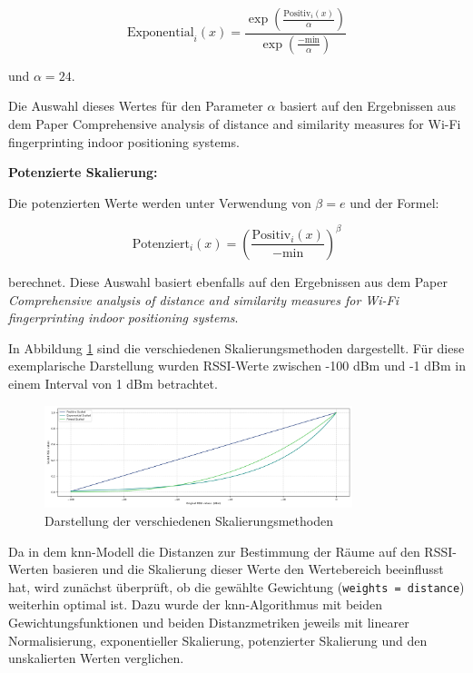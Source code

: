 \begin{equation}
    \text{Exponential}_i(x) = \frac{\exp\left(\frac{\text{Positiv}_i(x)}{\alpha}\right)}{\exp\left(\frac{-\text{min}}{\alpha}\right)}
    \label{eq:exponential_representation}
\end{equation}

und \(\alpha = 24\).

Die Auswahl dieses Wertes für den Parameter \(\alpha\) basiert auf den Ergebnissen aus dem Paper {Comprehensive analysis of distance and similarity measures for Wi-Fi fingerprinting indoor positioning systems}.

\textbf{Potenzierte Skalierung:}

Die potenzierten Werte werden unter Verwendung von \(\beta = e\) und der Formel:

\begin{equation}
    \text{Potenziert}_i(x) = \left(\frac{\text{Positiv}_i(x)}{-\text{min}}\right)^{\beta}
    \label{eq:powered_representation}
\end{equation}

berechnet. Diese Auswahl basiert ebenfalls auf den Ergebnissen aus dem Paper \textit{Comprehensive analysis of distance and similarity measures for Wi-Fi fingerprinting indoor positioning systems}.

In Abbildung \ref{fig:value_scaling_strategies_ignore_10} sind die verschiedenen Skalierungsmethoden dargestellt. Für diese exemplarische Darstellung wurden RSSI-Werte zwischen -100 dBm und -1 dBm in einem Interval von 1 dBm betrachtet.

\begin{figure}[H]
    \centering
    \includegraphics[width=0.8\textwidth]{images/plot_scaling_strategies.png}
    \caption{Darstellung der verschiedenen Skalierungsmethoden}
    \label{fig:value_scaling_strategies_ignore_10}
\end{figure}

Da in dem \gls{knn}-Modell die Distanzen zur Bestimmung der Räume auf den RSSI-Werten basieren und die Skalierung dieser Werte den Wertebereich beeinflusst hat, wird zunächst überprüft, ob die gewählte Gewichtung (\texttt{weights = distance}) weiterhin optimal ist. Dazu wurde der \gls{knn}-Algorithmus mit beiden Gewichtungsfunktionen und beiden Distanzmetriken jeweils mit linearer Normalisierung, exponentieller Skalierung, potenzierter Skalierung und den unskalierten Werten verglichen.

